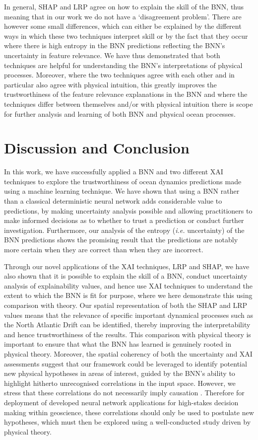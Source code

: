 \documentclass[a4paper]{article}
\begin{document}
In general, SHAP and LRP agree on how to explain the skill of the BNN, thus meaning that in our work we do not have a `disagreement problem'. There are however some small differences, which can either be explained by the different ways in which these two techniques interpret skill or by the fact that they occur where there is high entropy in the BNN predictions reflecting the BNN's uncertainty in feature relevance. We have thus demonstrated that both techniques are helpful for understanding the BNN's interpretations of physical processes. Moreover, where the two techniques agree with each other and in particular also agree with physical intuition, this greatly improves the trustworthiness of the feature relevance explanations in the BNN and where the techniques differ between themselves and/or with physical intuition there is scope for further analysis and learning of both BNN and physical ocean processes.

\section{Discussion and Conclusion}\label{sec:conclusion}
In this work, we have successfully applied a BNN and two different XAI techniques to explore the trustworthiness of ocean dynamics predictions made using a machine learning technique. We have shown that using a BNN rather than a classical deterministic neural network adds considerable value to predictions, by making uncertainty analysis possible and allowing practitioners to make informed decisions as to whether to trust a prediction or conduct further investigation. Furthermore, our analysis of the entropy (\textit{i.e.} uncertainty) of the BNN predictions shows the promising result that the predictions are notably more certain when they are correct than when they are incorrect. 

Through our novel applications of the XAI techniques, LRP and SHAP, we have also shown that it is possible to explain the skill of a BNN, conduct uncertainty analysis of explainability values, and hence use XAI techniques to understand the extent to which the BNN is fit for purpose, where we here demonstrate this using comparison with theory. Our spatial representation of both the SHAP and LRP values means that the relevance of specific important dynamical processes such as the North Atlantic Drift can be identified, thereby improving the interpretability and hence trustworthiness of the results. This comparison with physical theory is important to ensure that what the BNN has learned is genuinely rooted in physical theory. Moreover, the spatial coherency of both the uncertainty and XAI assessments suggest that our framework could be leveraged to identify potential new physical hypotheses in areas of interest, guided by the BNN's ability to highlight hitherto unrecognised correlations in the input space. However, we stress that these correlations do not necessarily imply causation \citep{samek2021explaining}. Therefore for deployment of developed neural network applications  for high-stakes decision making within geoscience, these correlations should only be used to postulate new hypotheses, which must then be explored using a well-conducted study driven by physical theory. 
\end{document}

